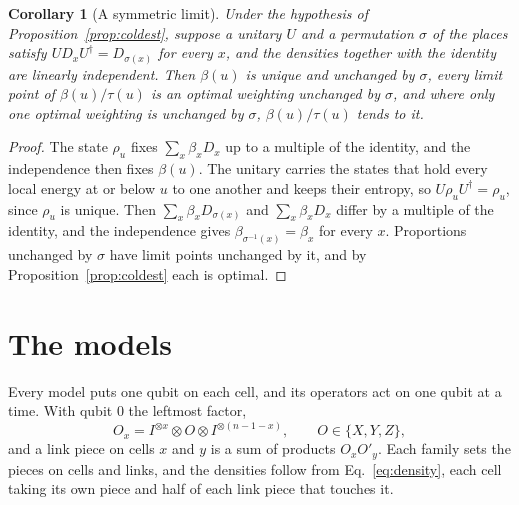 \documentclass[aps,prd,reprint,superscriptaddress]{revtex4-2}
\newtheorem{corollary}{Corollary}
\begin{document}
\begin{corollary}[A symmetric limit]\label{cor:symmetric}
Under the hypothesis of Proposition~\ref{prop:coldest}, suppose a unitary $U$ and a permutation $\sigma$ of the places satisfy $U D_x U^\dagger = D_{\sigma(x)}$ for every $x$, and the densities together with the identity are linearly independent. Then $\beta(u)$ is unique and unchanged by $\sigma$, every limit point of $\beta(u)/\tau(u)$ is an optimal weighting unchanged by $\sigma$, and where only one optimal weighting is unchanged by $\sigma$, $\beta(u)/\tau(u)$ tends to it.
\end{corollary}
\begin{proof}
The state $\rho_u$ fixes $\sum_x \beta_x D_x$ up to a multiple of the identity, and the independence then fixes $\beta(u)$. The unitary carries the states that hold every local energy at or below $u$ to one another and keeps their entropy, so $U\rho_u U^\dagger = \rho_u$, since $\rho_u$ is unique. Then $\sum_x \beta_x D_{\sigma(x)}$ and $\sum_x \beta_x D_x$ differ by a multiple of the identity, and the independence gives $\beta_{\sigma^{-1}(x)} = \beta_x$ for every $x$. Proportions unchanged by $\sigma$ have limit points unchanged by it, and by Proposition~\ref{prop:coldest} each is optimal.
\end{proof}

\section{The models}
\label{app:models}

Every model puts one qubit on each cell, and its operators act on one qubit at a time. With qubit $0$ the leftmost factor,
\begin{equation}
  O_x = I^{\otimes x} \otimes O \otimes I^{\otimes (n - 1 - x)}, \qquad O \in \{X, Y, Z\},
  \label{eq:sites}
\end{equation}
and a link piece on cells $x$ and $y$ is a sum of products $O_x O'_y$. Each family sets the pieces on cells and links, and the densities follow from Eq.~\eqref{eq:density}, each cell taking its own piece and half of each link piece that touches it.
\end{document}
